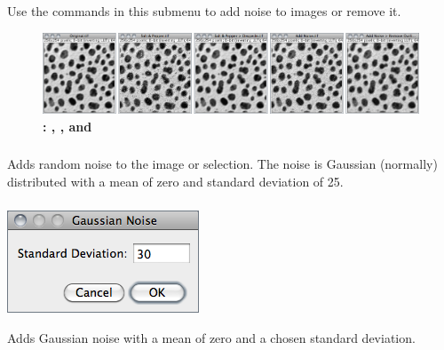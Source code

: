 Use the commands in this submenu to add noise to images or remove
it.
\begin{figure}[H]
\noindent \includegraphics[width=1\columnwidth]{images/Noise}\caption{\textbf{\protect{}:
\protect{}, \protect{},
\protect{} and \protect{}}}
\end{figure}





\subsubsection{\protect{}\label{sub:Add-Noise}}

Adds random noise to the image or selection. The noise is Gaussian
(normally) distributed with a mean of zero and standard deviation
of 25. 




\subsubsection{\protect{}\label{sub:Add-Specified-Noise...}}

\begin{minipage}[c][1\totalheight][t]{0.32\columnwidth}%
\includegraphics[scale=0.55]{images/AddSpecifiedNoise}%
\end{minipage}%
\begin{minipage}[c][1\totalheight][t]{0.68\columnwidth}%
Adds Gaussian noise with a mean of zero and a chosen standard deviation.


%
\end{minipage}


